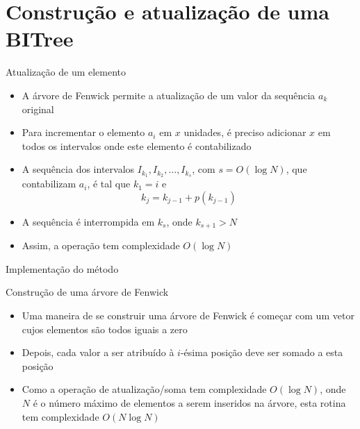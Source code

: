 \section{Construção e atualização de uma BITree}

\begin{frame}[fragile]{Atualização de um elemento}

    \begin{itemize}
        \item A árvore de Fenwick permite a atualização de um valor da sequência $a_k$ 
            original

        \item Para incrementar o elemento $a_i$ em $x$ unidades, é preciso adicionar $x$ em
             todos os intervalos onde este elemento é contabilizado

        \item A sequência dos intervalos $I_{k_1}, I_{k_2}, \ldots, I_{k_s}$, com $s = O(\log N)$,
            que contabilizam $a_i$, é tal que $k_1 = i$ e
        \[
            k_j = k_{j - 1} + p(k_{j - 1})
        \]

        \item A sequência é interrompida em $k_s$, onde $k_{s + 1} > N$

        \item Assim, a operação  tem complexidade $O(\log N)$
    \end{itemize}

\end{frame}



\begin{frame}[fragile]{Implementação do método }
\end{frame}

\begin{frame}[fragile]{Construção de uma árvore de Fenwick}

    \begin{itemize}
        \item Uma maneira de se construir uma árvore de Fenwick é começar com um vetor cujos
            elementos são todos iguais a zero

        \item Depois, cada valor a ser atribuído à $i$-ésima posição deve ser somado a esta
            posição

        \item Como a operação de atualização/soma tem complexidade $O(\log N)$, onde $N$ é o 
            número máximo de elementos a serem inseridos na árvore, esta rotina tem complexidade
            $O(N\log N)$

    \end{itemize}

\end{frame}


